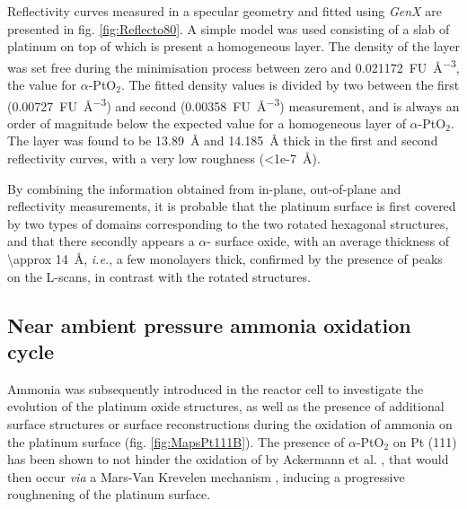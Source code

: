 Reflectivity curves measured in a specular geometry and fitted using \textit{GenX} \parencite{Bjorck2007, Glavic2022} are presented in fig. \ref{fig:Reflecto80}.
A simple model was used consisting of a slab of platinum on top of which is present a homogeneous layer.
The density of the layer was set free during the minimisation process between zero and \qty{0.021172}{FU\per\cubic\angstrom}, the value for $\alpha$-PtO$_2$.
The fitted density values is divided by two between the first (\qty{0.00727}{FU\per\cubic\angstrom}) and second (\qty{0.00358}{FU\per\cubic\angstrom}) measurement, and is always an order of magnitude below the expected value for a homogeneous layer of $\alpha$-PtO$_2$.
The layer was found to be \qty{13.89}{\angstrom} and \qty{14.185}{\angstrom} thick in the first and second reflectivity curves, with a very low roughness (\qty{<1e-7}{\angstrom}).

By combining the information obtained from in-plane, out-of-plane and reflectivity measurements, it is probable that the platinum surface is first covered by two types of domains corresponding to the two rotated hexagonal structures, and that there secondly appears a $\alpha$- surface oxide, with an average thickness of \qty{\approx 14}{\angstrom}, \textit{i.e.}, a few monolayers thick, confirmed by the presence of peaks on the L-scans, in contrast with the rotated structures.


\subsection{Near ambient pressure ammonia oxidation cycle}

Ammonia was subsequently introduced in the reactor cell to investigate the evolution of the platinum oxide structures, as well as the presence of additional surface structures or surface reconstructions during the oxidation of ammonia on the platinum surface (fig. \ref{fig:MapsPt111B}).
The presence of $\alpha$-PtO$_2$ on Pt (111) has been shown to not hinder the oxidation of  by Ackermann et al. \parencite*{Ackermann2007}, that would then occur \textit{via} a Mars-Van Krevelen mechanism \parencite{Mars1954}, inducing a progressive roughnening of the platinum surface.

